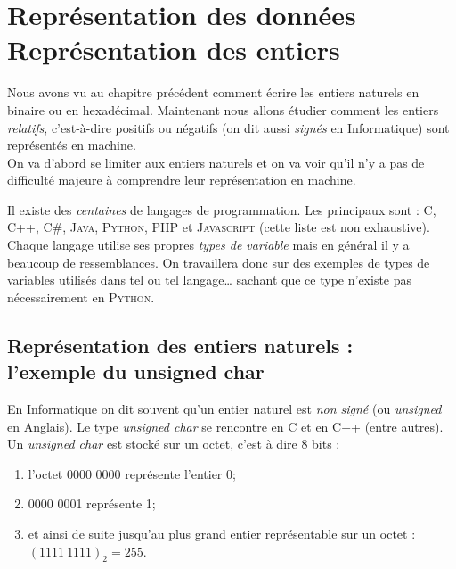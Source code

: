 \documentclass[a4paper,12pt,french]{book}
\begin{document}
\setcounter{chapter}{2}

\chapter{\large Représentation des données\\[-1em]\fontsize{35pt}{42pt}\selectfont\titlefont Représentation des entiers}

Nous avons vu au chapitre précédent comment écrire les entiers naturels en binaire ou en hexadécimal. Maintenant nous allons
étudier comment les entiers \textit{relatifs}, c'est-à-dire positifs ou négatifs (on dit aussi \textit{signés} en Informatique) sont
représentés en machine.\\
On va d'abord se limiter aux entiers naturels et on va voir qu'il n'y a pas de difficulté majeure à comprendre leur représentation en machine.


\begin{remarque}[ importante]
Il existe des \textit{centaines} de langages de programmation. Les principaux sont : \textsc{C},  \textsc{C++}, \textsc{C\#}, \textsc{Java},
\textsc{Python}, \textsc{PHP} et \textsc{Javascript} (cette liste est non exhaustive). Chaque langage utilise ses propres \textit{types de variable}
mais en général il y a beaucoup de ressemblances. On travaillera donc sur des exemples de types de variables utilisés dans tel ou tel langage\ldots
sachant que ce type n'existe pas nécessairement en \textsc{Python}.
\end{remarque}

\section{Représentation des entiers naturels :\\ l'exemple du unsigned char}

En Informatique on dit souvent qu'un entier naturel est \textit{non signé} (ou \textit{unsigned} en Anglais). Le type \textit{unsigned char} se
rencontre en \textsc{C} et en \textsc{C++} (entre autres).\\

Un \textit{unsigned char} est stocké sur un octet, c'est à dire 8 bits :
\begin{enumerate}[\textbullet]
	\item 	l'octet 0000 0000 représente l'entier 0;
	\item 	0000 0001 représente 1;
	\item 	et ainsi de suite jusqu'au plus grand entier représentable sur un octet : \\$(1111\ 1111)_2=255$.
\end{enumerate}
\end{document}
